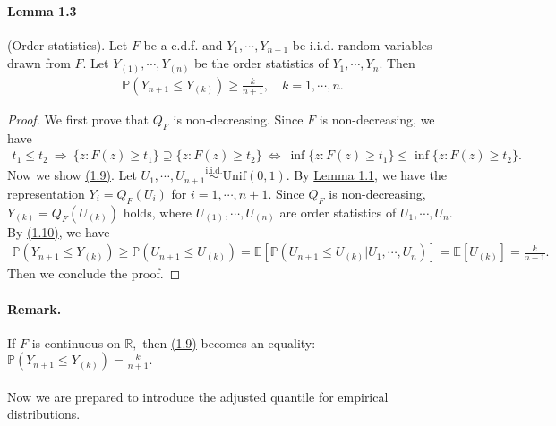 \documentclass{article}
\numberwithin{equation}{section}
\newcommand{\E}{\mathbb{E}}
\begin{document}
\paragraph{Lemma 1.3 \label{Lemma 1.3}} (Order statistics). Let $F$ be a c.d.f. and $Y_1,\cdots,Y_{n+1}$ be i.i.d. random variables drawn from $F.$ Let $Y_{(1)},\cdots,Y_{(n)}$ be the order statistics of $Y_1,\cdots,Y_n.$ Then
\begin{align*}
	\mathbb{P}(Y_{n+1}\leq Y_{(k)}) \geq \frac{k}{n+1},\quad k=1,\cdots,n.\tag{1.9}\label{1.9}
\end{align*}
\begin{proof}
We first prove that $Q_F$ is non-decreasing. Since $F$ is non-decreasing, we have
\begin{align*}
	t_1\leq t_2\ \Rightarrow\ \{z:F(z)\geq t_1\}\supseteq\{z:F(z)\geq t_2\}\ \Leftrightarrow\ \inf\{z:F(z)\geq t_1\}\leq\inf\{z:F(z)\geq t_2\}.\tag{1.10}\label{1.10}
\end{align*}
Now we show \hyperref[1.9]{(1.9)}. Let $U_1,\cdots,U_{n+1}\overset{\mathrm{i.i.d.}}{\sim}\mathrm{Unif}(0,1).$ By \hyperref[Lemma 1.1]{Lemma 1.1}, we have the representation $Y_i = Q_F(U_i)$ for $i=1,\cdots,n+1.$ Since $Q_F$ is non-decreasing, $Y_{(k)}=Q_F(U_{(k)})$ holds, where $U_{(1)},\cdots,U_{(n)}$ are order statistics of $U_1,\cdots,U_n.$ By \hyperref[1.10]{(1.10)}, we have
\begin{align*}
	\mathbb{P}(Y_{n+1}\leq Y_{(k)}) \geq \mathbb{P}(U_{n+1}\leq U_{(k)}) = \E\left[\mathbb{P}(U_{n+1}\leq U_{(k)}|U_1,\cdots,U_n)\right] = \E[U_{(k)}] = \frac{k}{n+1}.\tag{1.11}
\end{align*}
Then we conclude the proof.
\end{proof}

\paragraph{Remark.} If $F$ is continuous on $\mathbb{R},$ then \hyperref[1.9]{(1.9)} becomes an equality: $\mathbb{P}(Y_{n+1}\leq Y_{(k)})=\frac{k}{n+1}.$

\paragraph{} Now we are prepared to introduce the adjusted quantile for empirical distributions.
\end{document}
